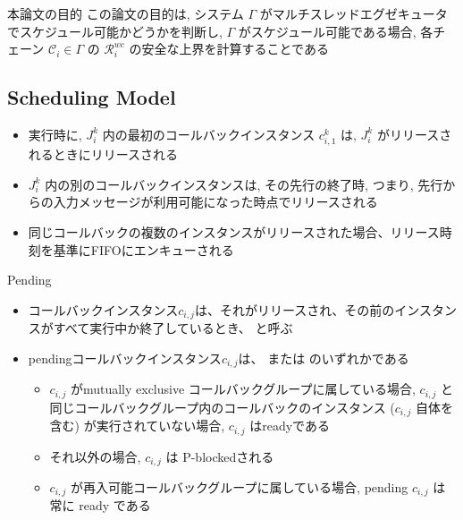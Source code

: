 \begin{frame}{本論文の目的}
    この論文の目的は, システム $\Gamma$ がマルチスレッドエグゼキュータでスケジュール可能かどうかを判断し, $\Gamma$ がスケジュール可能である場合, 各チェーン $\mathcal{C}_{i} \in \Gamma$ の $\mathcal{R}_{i}^{w c}$ の安全な上界を計算することである
\end{frame}


\subsection{Scheduling Model}
\label{ssec: scheduling_model}


\begin{frame}{}
    \begin{itemize}
        \item 実行時に, $J_{i}^{k}$ 内の最初のコールバックインスタンス $c_{i, 1}^{k}$ は, $J_{i}^{k}$ がリリースされるときにリリースされる
        \item $J_{i}^{k}$ 内の別のコールバックインスタンスは, その先行の終了時, つまり, 先行からの入力メッセージが利用可能になった時点でリリースされる
        \item 同じコールバックの複数のインスタンスがリリースされた場合、リリース時刻を基準にFIFOにエンキューされる
    \end{itemize}
\end{frame}

\begin{frame}{Pending}


    \begin{itemize}
        \item コールバックインスタンス$c_{i, j}$は、それがリリースされ、その前のインスタンスがすべて実行中か終了しているとき、 と呼ぶ
        \item pendingコールバックインスタンス$c_{i, j}$は、 または のいずれかである
              \begin{itemize}
                  \item  $c_{i, j}$ がmutually exclusive コールバックグループに属している場合, $c_{i, j}$ と同じコールバックグループ内のコールバックのインスタンス ($c_{i, j}$ 自体を含む) が実行されていない場合, $c_{i, j}$ はreadyである
                  \item それ以外の場合, $c_{i, j}$ は P-blockedされる

                  \item  $c_{i, j}$ が再入可能コールバックグループに属している場合, pending $c_{i, j}$ は常に ready である
              \end{itemize}
    \end{itemize}
\end{frame}

